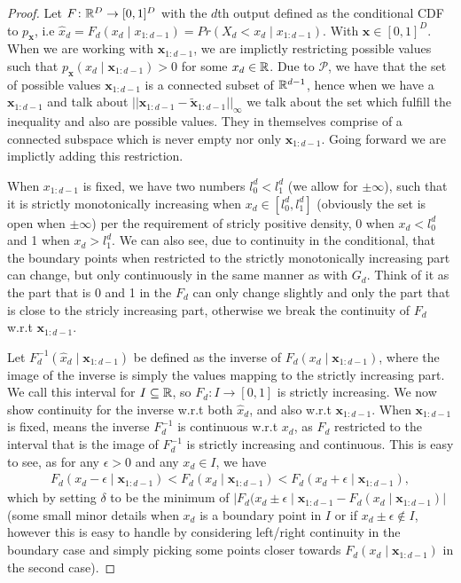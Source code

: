 \begin{proof}
    Let \(F\colon \mathbb{R}^D \to [0,1]^D\) with the \(d\)th output defined as the conditional CDF to \(p_{\bm x}\), i.e 
    \(\hat{x}_d = F_d(x_d \mid x_{1:d-1}) = Pr(X_d < x_d \mid x_{1:d-1})\). With \(\bm x \in [0,1]^D\). When we are
    working with \(\bm x_{1:d-1}\), we are implictly restricting possible values such that \(p_{\bm x}(x_d \mid \bm x_{1:d-1}) > 0\) 
    for some \(x_d \in \mathbb{R}\). Due to \(\mathscr{P}\), we have that the set of possible values \(\bm x_{1:d-1}\) is a connected subset
    of \(\mathbb{R}^{d-1}\), hence when we have a \(\bm x_{1:d-1}\) and talk about 
    \(\lvert\lvert \bm x_{1:d-1} - \tilde{\bm x}_{1:d-1}\rvert\rvert_{\infty}\) we talk about the set which fulfill the inequality 
    and also are possible values. They in themselves comprise of a connected subspace which is never empty nor only \(\bm x_{1:d-1}\). Going forward we 
    are implictly adding this restriction.

    When \(x_{1:d-1}\) is fixed, we have two numbers
    \(l_0^d < l_1^d\) (we allow for \(\pm \infty\)), such that it is strictly monotonically increasing when
    \(x_d \in [l_0^d, l_1^d]\) (obviously the set is open when \(\pm \infty\)) per the requirement of stricly positive density, 
    0 when \(x_d < l_0^d\) and 1 when \(x_d > l_1^d\). We can also see, due to continuity in the conditional, that the boundary points
    when restricted to the strictly monotonically increasing part can change, but only continuously in the same manner as with \(G_d\). 
    Think of it as the part that is 0 and 1 in the \(F_d\) can only change slightly and only the part that is close to the stricly increasing part,
    otherwise we break the continuity of \(F_d\) w.r.t \(\bm x_{1:d-1}\). 

    Let \(F^{-1}_d(\hat{x}_d \mid \bm x_{1:d-1})\) be defined as the inverse of \(F_d(x_d\mid \bm x_{1:d-1})\), where the image of the inverse is simply the values mapping to the strictly increasing part. 
    We call this interval for \(I \subseteq\mathbb{R}\), so \(F_d\colon I \to [0,1]\) is strictly increasing.
    We now show continuity for the inverse w.r.t both \(\hat{x}_d\), and also w.r.t \(\bm x_{1:d-1}\). When \(\bm x_{1:d-1}\) is fixed, means the inverse \(F^{-1}_d\) is continuous w.r.t \(x_d\), as \(F_d\)
    restricted to the interval that is the image of \(F^{-1}_d\) is strictly increasing and continuous. This is easy to see, as for any \(\epsilon > 0\) and any \(x_d \in I\), we have
    \begin{align*}
        F_d(x_d - \epsilon \mid \bm x_{1:d-1}) < F_d(x_d\mid \bm x_{1:d-1}) < F_d(x_d + \epsilon \mid \bm x_{1:d-1}),
    \end{align*}
    which by setting \(\delta\) to be the minimum of \(\lvert F_d(x_d \pm \epsilon \mid \bm x_{1:d-1} - F_d(x_d \mid \bm x_{1:d-1})\rvert\) (some small minor details when \(x_d\) is a boundary point in \(I\) 
    or if \( x_d\pm \epsilon \notin I\), however this is easy to handle by considering left/right continuity in the boundary case and simply picking some points closer towards \(F_d(x_d\mid \bm x_{1:d-1})\) in the
    second case). 


\end{proof}
